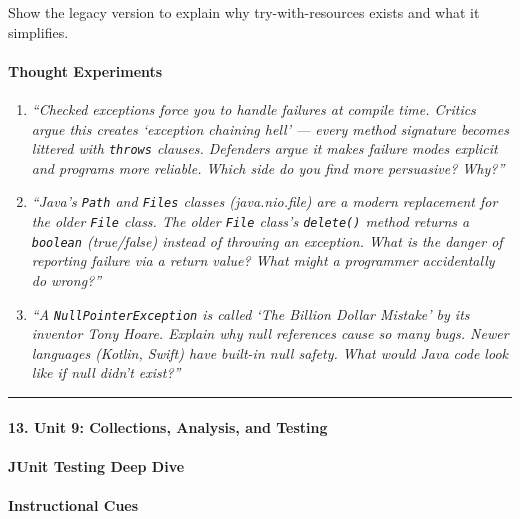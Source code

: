 \documentclass[
  justified,
  openright,
]{tufte-book}
\let\subsection\paragraph
\let\paragraph\paragraph
\let\subsection\paragraph
\let\paragraph\paragraph
\begin{document}
Show the legacy version to explain why try-with-resources exists and
what it simplifies.

\paragraph{Thought Experiments}\label{thought-experiments-40}

\begin{enumerate}
\def\labelenumi{\arabic{enumi}.}
\item
  \emph{``Checked exceptions force you to handle failures at compile
  time. Critics argue this creates `exception chaining hell' --- every
  method signature becomes littered with \texttt{throws} clauses.
  Defenders argue it makes failure modes explicit and programs more
  reliable. Which side do you find more persuasive? Why?''}
\item
  \emph{``Java's \texttt{Path} and \texttt{Files} classes
  (java.nio.file) are a modern replacement for the older \texttt{File}
  class. The older \texttt{File} class's \texttt{delete()} method
  returns a \texttt{boolean} (true/false) instead of throwing an
  exception. What is the danger of reporting failure via a return value?
  What might a programmer accidentally do wrong?''}
\item
  \emph{``A \texttt{NullPointerException} is called `The Billion Dollar
  Mistake' by its inventor Tony Hoare. Explain why null references cause
  so many bugs. Newer languages (Kotlin, Swift) have built-in null
  safety. What would Java code look like if null didn't exist?''}
\end{enumerate}

\begin{center}\rule{0.5\linewidth}{0.5pt}\end{center}

\subsection{13. Unit 9: Collections, Analysis, and
Testing}\label{unit-9-collections-analysis-and-testing-1}

\subsection{JUnit Testing Deep Dive}\label{junit-testing-deep-dive}

\paragraph{Instructional Cues}\label{instructional-cues-31}
\end{document}
